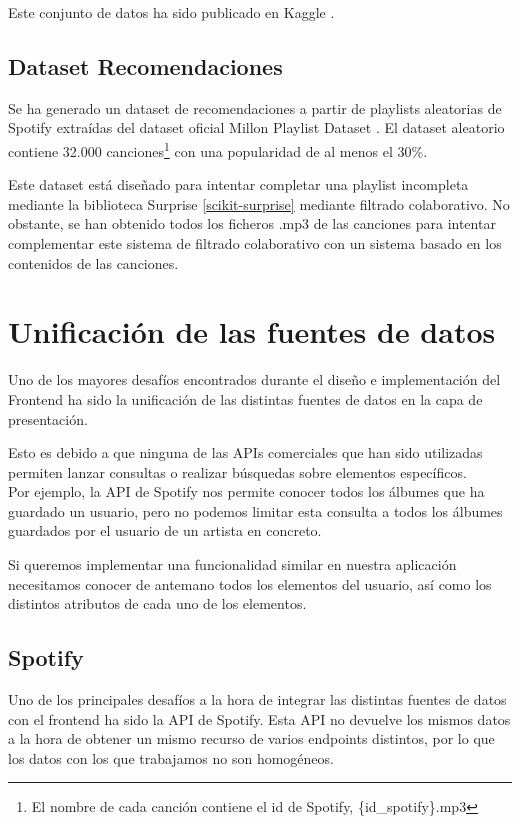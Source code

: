 Este conjunto de datos ha sido publicado en Kaggle \cite{LudwigMu18:online}. 

\subsection{Dataset Recomendaciones}\label{dataset_similitud}
Se ha generado un dataset de recomendaciones a partir de playlists aleatorias de Spotify extraídas del dataset oficial Millon Playlist Dataset \cite{million_playlist_dataset}. El dataset aleatorio contiene 32.000 canciones\footnote{El nombre de cada canción contiene el id de Spotify, \{id\_spotify\}.mp3} con una popularidad de al menos el 30\%.

Este dataset está diseñado para intentar completar una playlist incompleta mediante la biblioteca Surprise \ref{scikit-surprise} mediante filtrado colaborativo. No obstante, se han obtenido todos los ficheros .mp3 de las canciones para intentar complementar este sistema de filtrado colaborativo con un sistema basado en los contenidos de las canciones. 

\section{Unificación de las fuentes de
datos}\label{unificacion-de-las-fuentes-de-datos}
Uno de los mayores desafíos encontrados durante el diseño e implementación del
Frontend ha sido la unificación de las distintas fuentes de datos en la capa de presentación.

Esto es debido a que ninguna de las APIs comerciales que han sido
utilizadas permiten lanzar consultas o realizar búsquedas sobre
elementos específicos.\\
Por ejemplo, la API de Spotify nos permite conocer todos los álbumes que
ha guardado un usuario, pero no podemos limitar esta consulta a todos
los álbumes guardados por el usuario de un artista en concreto.

Si queremos implementar una funcionalidad similar en nuestra aplicación
necesitamos conocer de antemano todos los elementos del usuario, así
como los distintos atributos de cada uno de los elementos.


\subsection{Spotify}\label{spotify}

Uno de los principales desafíos a la hora de integrar las distintas
fuentes de datos con el frontend ha sido la API de Spotify. Esta API no
devuelve los mismos datos a la hora de obtener un mismo recurso de
varios endpoints distintos, por lo que los datos con los que trabajamos
no son homogéneos.

